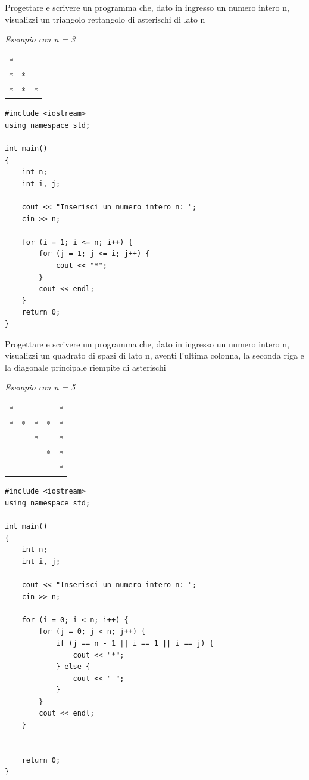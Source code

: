 \documentclass[11pt,fleqn]{book}
\begin{document}
\begin{esercizio}[2]
    Progettare e scrivere un programma che, dato in ingresso un numero intero n, visualizzi un triangolo rettangolo di asterischi di lato n

    \emph{Esempio con n = 3}
    
    \begin{tabular}{ccc}
        * &   &  \\
        * & * &  \\
        * & * &  *
    \end{tabular}
    
    \ifsoluzioni
    \solution
    \begin{lstlisting}[style=cpp]
#include <iostream>
using namespace std;

int main() 
{
    int n;
    int i, j;

    cout << "Inserisci un numero intero n: ";
    cin >> n;

    for (i = 1; i <= n; i++) {
        for (j = 1; j <= i; j++) {
            cout << "*";
        }
        cout << endl;
    }
    return 0;
}
    \end{lstlisting}
    \fi
\end{esercizio}


\begin{esercizio}[2]
    Progettare e scrivere un programma che, dato in ingresso un numero intero n, visualizzi un quadrato di spazi di lato n, aventi l'ultima colonna, la seconda riga e la diagonale principale riempite di asterischi

    \emph{Esempio con n = 5}

    \begin{tabular}{ccccc}
        * &   &   &   & * \\
        * & * & * & * & * \\
          &   & * &   & * \\
          &   &   & * & * \\
          &   &   &   & *
    \end{tabular}
    
    \ifsoluzioni
    \solution
    \begin{lstlisting}[style=cpp]
#include <iostream>
using namespace std;

int main() 
{
    int n;
    int i, j;

    cout << "Inserisci un numero intero n: ";
    cin >> n;

    for (i = 0; i < n; i++) {
        for (j = 0; j < n; j++) {
            if (j == n - 1 || i == 1 || i == j) {
                cout << "*";
            } else {
                cout << " ";
            }
        }
        cout << endl;
    }
    

    return 0;
}
    \end{lstlisting}
    \fi
\end{esercizio}
\end{document}
